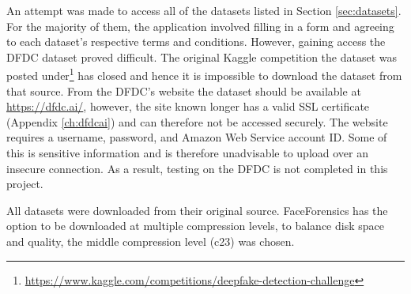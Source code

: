 An attempt was made to access all of the datasets listed in Section \ref{sec:datasets}. For the majority of them, the application involved filling in a form and agreeing to each dataset's respective terms and conditions. However, gaining access the DFDC dataset\cite{dolhansky2020deepfake} proved difficult. The original Kaggle competition the dataset was posted under\footnote{\url{https://www.kaggle.com/competitions/deepfake-detection-challenge}} has closed and hence it is impossible to download the dataset from that source. From the DFDC's website the dataset should be available at \url{https://dfdc.ai/}, however, the site known longer has a valid SSL certificate (Appendix \ref{ch:dfdcai}) and can therefore not be accessed securely. The website requires a username, password, and Amazon Web Service account ID. Some of this is sensitive information and is therefore unadvisable to upload over an insecure connection. As a result, testing on the DFDC is not completed in this project.

All datasets were downloaded from their original source. FaceForensics has the option to be downloaded at multiple compression levels, to balance disk space and quality, the middle compression level (c23) was chosen.
